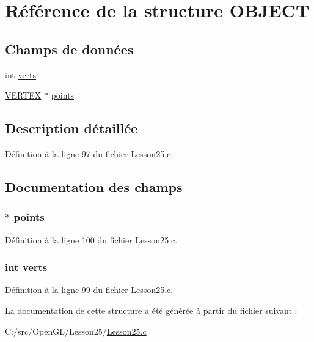 \hypertarget{struct_o_b_j_e_c_t}{}\section{Référence de la structure O\+B\+J\+E\+C\+T}
\label{struct_o_b_j_e_c_t}
\subsection*{Champs de données}
\begin{DoxyCompactItemize}
\item 
int \hyperlink{struct_o_b_j_e_c_t_a2d5a2945967be5484ebf1cf44f01b3c6}{verts}
\item 
\hyperlink{struct_v_e_r_t_e_x}{V\+E\+R\+T\+E\+X} $\ast$ \hyperlink{struct_o_b_j_e_c_t_a2ec0ea9991890a4c29a7636431c87447}{points}
\end{DoxyCompactItemize}


\subsection{Description détaillée}


Définition à la ligne 97 du fichier Lesson25.\+c.



\subsection{Documentation des champs}
\hypertarget{struct_o_b_j_e_c_t_a2ec0ea9991890a4c29a7636431c87447}{}
\subsubsection[{points}]{$\ast$ points}\label{struct_o_b_j_e_c_t_a2ec0ea9991890a4c29a7636431c87447}


Définition à la ligne 100 du fichier Lesson25.\+c.

\hypertarget{struct_o_b_j_e_c_t_a2d5a2945967be5484ebf1cf44f01b3c6}{}
\subsubsection[{verts}]{\setlength{\rightskip}{0pt plus 5cm}int verts}\label{struct_o_b_j_e_c_t_a2d5a2945967be5484ebf1cf44f01b3c6}


Définition à la ligne 99 du fichier Lesson25.\+c.



La documentation de cette structure a été générée à partir du fichier suivant \+:\begin{DoxyCompactItemize}
\item 
C\+:/src/\+Open\+G\+L/\+Lesson25/\hyperlink{_lesson25_8c}{Lesson25.\+c}\end{DoxyCompactItemize}
